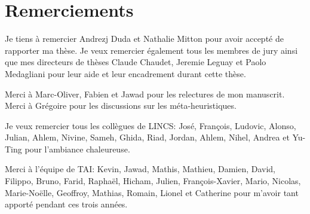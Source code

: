 




\begingroup

\let\clearpage\relax
\let\cleardoublepage\relax
\let\cleardoublepage\relax

\chapter*{Remerciements} %

Je tiens à remercier Andrezj Duda et Nathalie Mitton pour avoir accepté de rapporter ma thèse.
Je veux remercier également tous les membres de jury ainsi que mes directeurs de thèses Claude Chaudet, Jeremie Leguay et Paolo Medagliani pour leur aide et leur encadrement durant cette thèse.

\bigskip


Merci à Marc-Oliver, Fabien et Jawad pour les relectures de mon manuscrit.
Merci à Grégoire pour les discussions sur les méta-heuristiques.

\bigskip

Je veux remercier tous les collègues de LINCS: José, François, Ludovic, Alonso, Julian, Ahlem, Nivine, Sameh, Ghida, Riad, Jordan, Ahlem, Nihel, Andrea et Yu-Ting pour l'ambiance chaleureuse.
 
Merci à l'équipe de TAI: Kevin, Jawad, Mathis, Mathieu, Damien, David, Filippo, Bruno, Farid, Raphaël, Hicham, Julien, François-Xavier, Mario, Nicolas, Marie-Noëlle, Geoffroy, Mathias, Romain, Lionel et Catherine pour m'avoir tant apporté pendant ces trois années.

